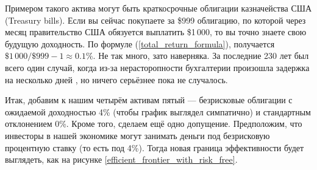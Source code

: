 Примером такого актива могут быть краткосрочные облигации казначейства США (Treasury bills). Если вы сейчас покупаете за \$999 облигацию, по которой через месяц правительство США обязуется выплатить \$1\,000, то вы точно знаете свою будущую доходность. По формуле (\ref{total_return_formula}), получается $\$1\,000/\$999 - 1 \approx 0.1\%$. Не так много, зато наверняка. За последние 230 лет был всего один случай, когда из-за нерасторопности бухгалтерии произошла задержка на несколько дней \cite{marron2011default}, но ничего серьёзнее пока не случалось.

Итак, добавим к нашим четырём активам пятый --- безрисковые облигации с ожидаемой доходностью 4\% (чтобы график выглядел симпатично) и стандартным отклонением 0\%. Кроме того, сделаем ещё одно допущение. Предположим, что инвесторы в нашей экономике могут занимать деньги под безрисковую процентную ставку (то есть под 4\%). Тогда новая граница эффективности будет выглядеть, как на рисунке \ref{efficient_frontier_with_risk_free}.

